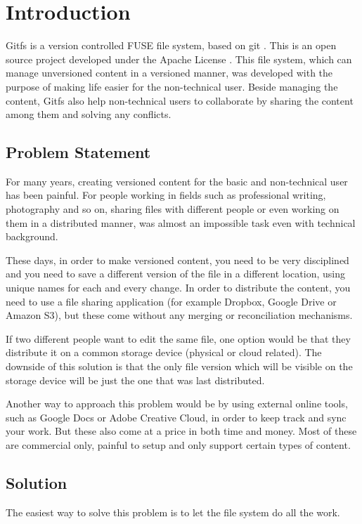 
\chapter{Introduction}

Gitfs is a version controlled FUSE \cite{Rajgarhia2010} file system, based on git \cite{Spinellis2012}. This is an open source project developed under the Apache License \cite{Sinclair2010}. This file system, which can manage unversioned content in a versioned manner, was developed with the purpose of making life easier for the non-technical user. Beside managing the content, Gitfs also help non-technical users to collaborate by sharing the content among them and solving any conflicts.

\section{Problem Statement}

For many years, creating versioned content for the basic and non-technical user has been painful. For people working in fields such as professional writing, photography and so on, sharing files with different people or even working on them in a distributed manner, was almost an impossible task even with technical background.

These days, in order to make versioned content, you need to be very disciplined and you need to save a different version of the file in a different location, using unique names for each and every change. In order to distribute the content, you need to use a file sharing application (for example Dropbox, Google Drive or Amazon S3), but these come without any merging or reconciliation mechanisms. 

If two different people want to edit the same file, one option would be that they distribute it on a common storage device (physical or cloud related). The downside of this solution is that the only file version which will be visible on the storage device will be just the one that was last distributed.

Another way to approach this problem would be by using external online tools, such as Google Docs or Adobe Creative Cloud, in order to keep track and sync your work. But these also come at a price in both time and money. Most of these are commercial only, painful to setup and only support certain types of content.

\section{Solution}
The easiest way to solve this problem is to let the file system do all the work.

